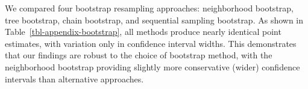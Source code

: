 \documentclass[
  12pt,
  letterpaper,
  DIV=11,
  numbers=noendperiod]{scrartcl}
\theoremstyle{plain}
\theoremstyle{definition}
\begin{document}
We compared four bootstrap resampling approaches: neighborhood
bootstrap, tree bootstrap, chain bootstrap, and sequential sampling
bootstrap. As shown in Table~\ref{tbl-appendix-bootstrap}, all methods
produce nearly identical point estimates, with variation only in
confidence interval widths. This demonstrates that our findings are
robust to the choice of bootstrap method, with the neighborhood
bootstrap providing slightly more conservative (wider) confidence
intervals than alternative approaches.

\begin{table}

\caption{\label{tbl-appendix-bootstrap}Sensitivity Analysis: Bootstrap
Method Comparison. All estimates use SS weights, N=980,000, and MBSU
(Moderate) adjustment. Source: Authors' Own Work.}

\centering{

\centering\begingroup\fontsize{8}{10}\selectfont

}
\end{table}
\end{document}
